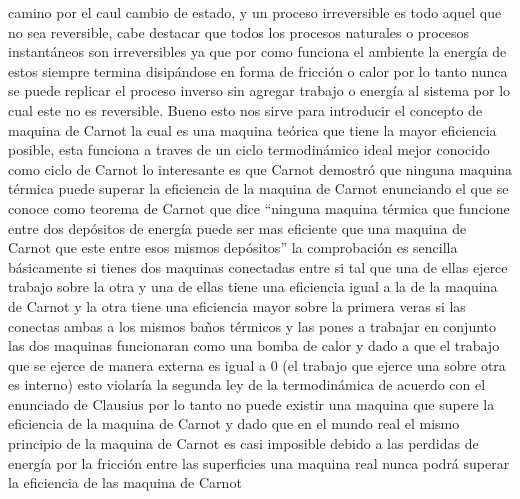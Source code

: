 \documentclass{article}
\begin{document}
camino por el caul cambio de estado, y un proceso irreversible es todo aquel que no sea reversible, cabe destacar que todos los procesos naturales
o procesos instantáneos son irreversibles ya que por como funciona el ambiente la energía de estos siempre termina disipándose en forma de fricción o calor
por lo tanto nunca se puede replicar el proceso inverso sin agregar trabajo o energía al sistema por lo cual este no es reversible.
Bueno esto nos sirve para introducir el concepto de maquina de Carnot la cual es una maquina teórica que tiene la mayor eficiencia posible,
esta funciona a traves de un ciclo termodinámico ideal mejor conocido como ciclo de Carnot lo interesante es que Carnot demostró que ninguna maquina 
térmica puede superar la eficiencia de la maquina de Carnot enunciando el que se conoce como teorema de Carnot que dice ``ninguna maquina térmica que funcione
entre dos depósitos de energía puede ser mas eficiente que una maquina de Carnot que este entre esos mismos depósitos''
la comprobación es sencilla básicamente si tienes dos maquinas conectadas entre si tal que una de ellas ejerce trabajo sobre la otra y una de ellas
tiene una eficiencia igual a la de la maquina de Carnot y la otra tiene una eficiencia mayor sobre la primera veras si las conectas ambas a los mismos
baños térmicos y las pones a trabajar en conjunto las dos maquinas funcionaran como una bomba de calor y dado a que el trabajo que se ejerce de manera
externa es igual a 0 (el trabajo que ejerce una sobre otra es interno) esto violaría la segunda ley de la termodinámica de acuerdo con el enunciado de Clausius
por lo tanto no puede existir una maquina que supere la eficiencia de la maquina de Carnot y dado que en el mundo real el mismo principio de la maquina de Carnot
es casi imposible debido a las perdidas de energía por la fricción entre las superficies una maquina real nunca podrá superar la eficiencia de las maquina de Carnot
\end{document}
